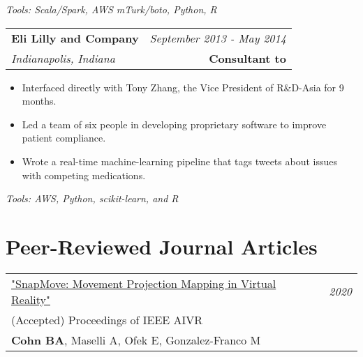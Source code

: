 \documentclass[10pt,a4paper]{article}
\begin{document}
  \vspace*{2mm}\setlength\parindent{2mm}\begin{minipage}{16.8cm}
    \textit{Tools: Scala/Spark, AWS mTurk/boto, Python, R }
  \end{minipage}

  \vspace*{3mm}\noindent\begin{tabularx}{17cm}{X r}
    \textbf{Eli Lilly and Company} & \textit{September 2013 - May 2014} \\
    \textit{Indianapolis, Indiana} & \textbf{Consultant to} 
  \end{tabularx}

  \vspace*{1mm}\noindent\begin{minipage}{17cm}
    \begin{itemize}[leftmargin=6mm, topsep=0mm, itemsep=-1mm]
      \item Interfaced directly with Tony Zhang, the Vice President of R\&D-Asia for 9 months.
      \item Led a team of six people in developing proprietary software to improve patient compliance.
      \item Wrote a real-time machine-learning pipeline that tags tweets about issues with competing medications.
    \end{itemize}
  \end{minipage}

  \vspace*{2mm}\setlength\parindent{2mm}\begin{minipage}{16.8cm}
    \textit{Tools: AWS, Python, scikit-learn, and R} 
  \end{minipage}




\vspace*{3mm}\section*{Peer-Reviewed Journal Articles} 

\vspace*{1mm}\noindent\begin{tabularx}{17cm}{X r}
   \href{https://github.com/bc/resume/raw/master/papers/cohn_et_al_aivr_2020_snapmov.pdf}{"SnapMove: Movement Projection Mapping in Virtual Reality"} & \textit{2020}\\
    (Accepted) Proceedings of IEEE AIVR \\
   \textbf{Cohn BA}, Maselli A, Ofek E, Gonzalez-Franco M\\[2mm]
\end{tabularx}
\end{document}
